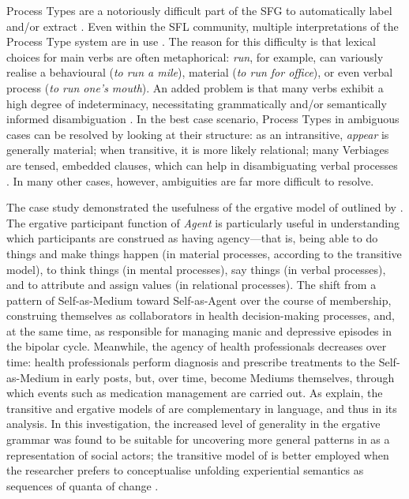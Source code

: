 \noindent Process Types are a notoriously difficult part of the \gls{SFG} to automatically label and\slash or extract \cite{costetchi_method_2013}. Even within the \gls{SFL} community, multiple interpretations of the Process Type system are in use \cite[c.f. the \emph{Cardiff Grammar}---][]{fawcett_theory_2000}. The reason for this difficulty is that lexical choices for main verbs are often metaphorical: \emph{run}, for example, can variously realise a behavioural (\emph{to run a mile}), material (\emph{to run for office}), or even verbal process (\emph{to run one's mouth}). An added problem is that many verbs exhibit a high degree of indeterminacy, necessitating grammatically and\slash or semantically informed disambiguation \cite{gwilliams_indeterminacy_2015,odonnell_survey_2009}. In the best case scenario, Process Types in ambiguous cases can be resolved by looking at their  structure: as an intransitive, \emph{appear} is generally material; when transitive, it is more likely relational; many Verbiages are tensed, embedded clauses, which can help in disambiguating verbal processes \cite{gwilliams_indeterminacy_2015}. In many other cases, however, ambiguities are far more difficult to resolve.

The case study demonstrated the usefulness of the ergative model of  outlined by \textcite{halliday_notes_1968,halliday_notes_1967-1,halliday_notes_1967}. The ergative participant function of \emph{Agent} is particularly useful in understanding which participants are construed as having agency---that is, being able to do things and make things happen (in material processes, according to the transitive model), to think things (in mental processes), say things (in verbal processes), and to attribute and assign values (in relational processes). The   shift from a pattern of Self\hyp{}as\hyp{}Medium toward Self\hyp{}as\hyp{}Agent over the course of membership, construing themselves as collaborators in health decision\hyp{}making processes, and, at the same time, as responsible for managing manic and depressive episodes in the \gls{bipolar} cycle. Meanwhile, the agency of health professionals decreases over time: health professionals perform diagnosis and prescribe treatments to the Self\hyp{}as\hyp{}Medium in early \glspl{post}, but, over time, become Mediums themselves, through which events such as medication management are carried out. As \textcite{halliday_introduction_2004} explain, the transitive and ergative models of  are complementary in language, and thus in its analysis. In this investigation, the increased level of generality in the ergative grammar was found to be suitable for uncovering more general patterns in  as a representation of social actors; the transitive model of  is better employed when the researcher prefers to conceptualise unfolding experiential semantics as sequences of quanta of change \cite{halliday1999construing}.

